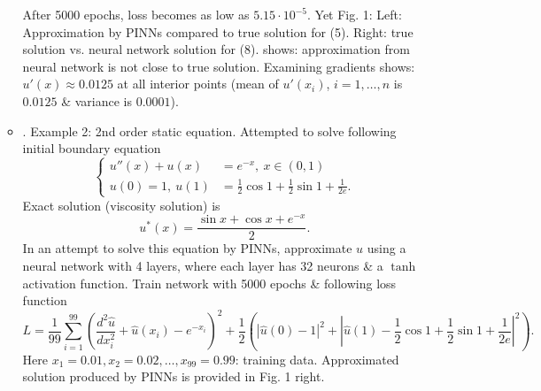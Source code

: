 \documentclass{article}
\begin{document}
\begin{itemize}
\begin{itemize}
		After 5000 epochs, loss becomes as low as $5.15\cdot10^{-5}$. Yet {\sf Fig. 1: Left: Approximation by PINNs compared to true solution for (5). Right: true solution vs. neural network solution for (8).} shows: approximation from neural network is not close to true solution. Examining gradients shows: $u'(x)\approx0.0125$ at all interior points (mean of $u'(x_i)$, $i = 1,\ldots,n$ is $0.0125$ \& variance is $0.0001$).
		\item {. Example 2: 2nd order static equation.} Attempted to solve following initial boundary equation
		\begin{equation*}
			\left\{\begin{split}
				u''(x) + u(x) &= e^{-x},\ x\in(0,1)\\
				u(0) = 1,\ u(1) &= \frac{1}{2}\cos1 + \frac{1}{2}\sin1 + \frac{1}{2e}.
			\end{split}\right.
		\end{equation*}
		Exact solution (viscosity solution) is
		\begin{equation*}
			u^*(x) = \frac{\sin x + \cos x + e^{-x}}{2}.
		\end{equation*}
		In an attempt to solve this equation by PINNs, approximate $u$ using a neural network with 4 layers, where each layer has 32 neurons \& a $\tanh$ activation function. Train network with 5000 epochs \& following loss function
		\begin{equation*}
			L = \frac{1}{99}\sum_{i=1}^{99} \left(\frac{d^2\hat{u}}{dx_i^2} + \hat{u}(x_i) - e^{-x_i}\right)^2 + \frac{1}{2}\left(|\hat{u}(0) - 1|^2 + \left|\hat{u}(1) - \frac{1}{2}\cos1 + \frac{1}{2}\sin1 + \frac{1}{2e}\right|^2\right).
		\end{equation*}
		Here $x_1 = 0.01,x_2 = 0.02,\ldots,x_{99} = 0.99$: training data. Approximated solution produced by PINNs is provided in {\sf Fig. 1 right}.
		

\end{itemize}
\end{itemize}
\end{document}
